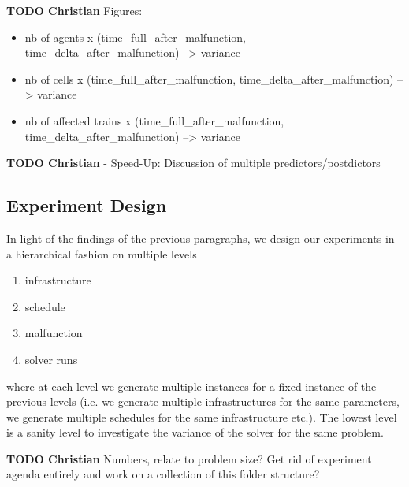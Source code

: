 \documentclass{article}
\begin{document}
\begin{mdframed}
{\bf TODO Christian} Figures:
\begin{itemize}
    \item nb of agents x (time\_full\_after\_malfunction, time\_delta\_after\_malfunction) --> variance
    \item nb of cells x (time\_full\_after\_malfunction, time\_delta\_after\_malfunction) --> variance
    \item nb of affected trains x (time\_full\_after\_malfunction, time\_delta\_after\_malfunction) --> variance
\end{itemize}
\end{mdframed}




\begin{mdframed}
{\bf TODO Christian} - Speed-Up: Discussion of multiple predictors/postdictors
\end{mdframed}



\subsection{Experiment Design}

In light of the findings of the previous paragraphs, we design our experiments in a hierarchical fashion on multiple levels
\begin{enumerate}
    \item infrastructure
    \item schedule
    \item malfunction
    \item solver runs
\end{enumerate}
where at each level we generate multiple instances for a fixed instance of the previous levels (i.e. we generate multiple infrastructures for the same parameters, we generate multiple schedules for the same infrastructure etc.). The lowest level is a sanity level to investigate the variance of the solver for the same problem.


\begin{mdframed}
{\bf TODO Christian} Numbers, relate to problem size? Get rid of experiment agenda entirely and work on a collection of this folder structure?
\end{mdframed}
\end{document}
